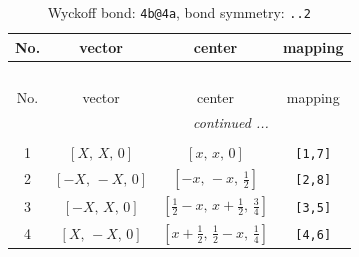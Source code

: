 \documentclass[fleqn,8pt]{jsarticle}
\begin{document}
\begin{longtable}{cccc}
\caption{Wyckoff bond: {\tt 4b@4a}, bond symmetry: {\tt ..2}}
 \\
 \hline \hline
No. & vector & center & mapping \\ \hline \endfirsthead

\multicolumn{3}{l}{\tablename\ \thetable{}} \\
 \hline \hline
No. & vector & center & mapping \\ \hline \endhead

 \hline \hline
\multicolumn{3}{r}{\footnotesize\it continued ...} \\ \endfoot

 \hline \hline
\multicolumn{3}{r}{} \\ \endlastfoot

1 & $\left[ X,\, X,\, 0 \right]$ & $\left[ x,\, x,\, 0 \right]$ & {\tt [1,7]} \\ \hline
2 & $\left[ - X,\, - X,\, 0 \right]$ & $\left[ - x,\, - x,\, \frac{1}{2} \right]$ & {\tt [2,8]} \\ \hline
3 & $\left[ - X,\, X,\, 0 \right]$ & $\left[ \frac{1}{2} - x,\, x + \frac{1}{2},\, \frac{3}{4} \right]$ & {\tt [3,5]} \\ \hline
4 & $\left[ X,\, - X,\, 0 \right]$ & $\left[ x + \frac{1}{2},\, \frac{1}{2} - x,\, \frac{1}{4} \right]$ & {\tt [4,6]} \\
\end{longtable}
\renewcommand{\arraystretch}{1.2}
\end{document}
